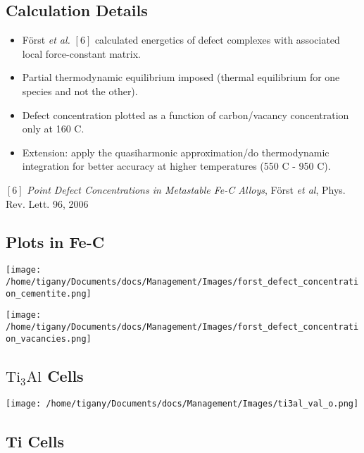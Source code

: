 \documentclass[11pt]{article}
\begin{document}
\subsection*{Calculation Details}
\label{sec:orgbd19179}
\begin{itemize}
\item Först \emph{et al.} \([6]\) calculated energetics of defect complexes with associated local
force-constant matrix.
\item Partial thermodynamic equilibrium imposed (thermal equilibrium for one species and not the other).
\item Defect concentration plotted as a function of carbon/vacancy concentration
only at 160\textdegree{} C.
\item Extension: apply the quasiharmonic approximation/do thermodynamic integration
for better accuracy at higher temperatures (550\textdegree{} C - 950\textdegree{} C).
\end{itemize}

\([6]\) \emph{Point Defect Concentrations in Metastable Fe-C Alloys}, Först \emph{et
al}, Phys. Rev. Lett. 96, 2006



\subsection*{Plots in Fe-C}
\label{sec:orgd5d9bbb}
\begin{center}
\texttt{[image: /home/tigany/Documents/docs/Management/Images/forst\_defect\_concentration\_cementite.png]}
\label{org5b33b73}
\end{center}

\begin{center}
\texttt{[image: /home/tigany/Documents/docs/Management/Images/forst\_defect\_concentration\_vacancies.png]}
\label{orga721d0e}
\end{center}

\subsection*{\(\text{Ti}_{3}\text{Al}\)  Cells}
\label{sec:org8455f5d}
\begin{center}
\texttt{[image: /home/tigany/Documents/docs/Management/Images/ti3al\_val\_o.png]}
\label{org5997962}
\end{center}

\subsection*{Ti Cells}
\label{sec:orgdd18c31}
\end{document}
